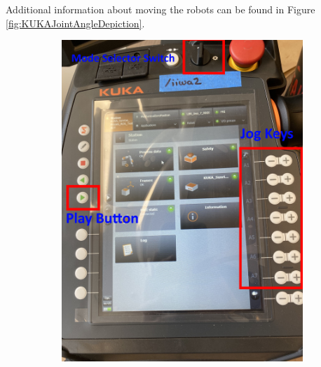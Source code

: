 \documentclass[12pt, letterpaper]{article}
\begin{document}
Additional information about moving the robots can be found in Figure \ref{fig:KUKAJointAngleDepiction}.


\begin{figure}[h!]
    \centering
    \begin{subfigure}[b]{0.32\textwidth}
        \centering
        \includegraphics[width=\textwidth]{Images/ImportantButtonsFront.jpg}
        \caption{}
        \label{fig:buttonsfront}
    \end{subfigure}
    \hfill
    \begin{subfigure}[b]{0.32\textwidth}
        \centering

\end{subfigure}
\end{figure}
\end{document}
